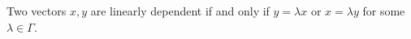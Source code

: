 Two vectors $x, y$ are linearly dependent if and only if $y = \lambda x$ or $x = \lambda y$ for some $\lambda \in \Gamma$.
